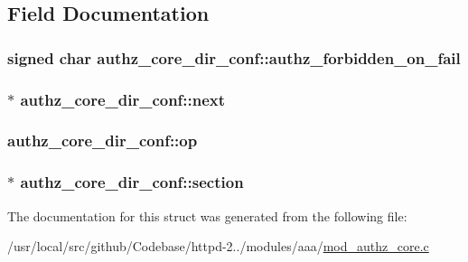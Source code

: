 \subsection{Field Documentation}
\subsubsection[{\texorpdfstring{authz\+\_\+forbidden\+\_\+on\+\_\+fail}{authz_forbidden_on_fail}}]{\setlength{\rightskip}{0pt plus 5cm}signed char authz\+\_\+core\+\_\+dir\+\_\+conf\+::authz\+\_\+forbidden\+\_\+on\+\_\+fail}\hypertarget{structauthz__core__dir__conf_ae0399fd05f09ca11dbb6bf0fffca58b8}{}\label{structauthz__core__dir__conf_ae0399fd05f09ca11dbb6bf0fffca58b8}
\subsubsection[{\texorpdfstring{next}{next}}]{$\ast$ authz\+\_\+core\+\_\+dir\+\_\+conf\+::next}\hypertarget{structauthz__core__dir__conf_a2469c2159ce29f5966c7fdf437aa24c1}{}\label{structauthz__core__dir__conf_a2469c2159ce29f5966c7fdf437aa24c1}
\subsubsection[{\texorpdfstring{op}{op}}]{ authz\+\_\+core\+\_\+dir\+\_\+conf\+::op}\hypertarget{structauthz__core__dir__conf_a89680d56c680114e8d21f0756d7abb66}{}\label{structauthz__core__dir__conf_a89680d56c680114e8d21f0756d7abb66}
\subsubsection[{\texorpdfstring{section}{section}}]{$\ast$ authz\+\_\+core\+\_\+dir\+\_\+conf\+::section}\hypertarget{structauthz__core__dir__conf_a2058282c5e8c08a4ad2dc0daadd6ee5f}{}\label{structauthz__core__dir__conf_a2058282c5e8c08a4ad2dc0daadd6ee5f}


The documentation for this struct was generated from the following file\+:\begin{DoxyCompactItemize}
\item 
/usr/local/src/github/\+Codebase/httpd-\/2../modules/aaa/\hyperlink{mod__authz__core_8c}{mod\+\_\+authz\+\_\+core.\+c}\end{DoxyCompactItemize}
